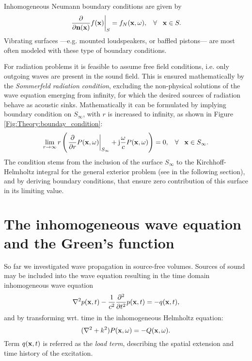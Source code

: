 \begin{itemize}
Inhomogeneous Neumann boundary conditions are given by
\begin{equation}
\left. \frac{\partial}{\partial \mathbf{n}(\mathbf{x})} f(\mathbf{x}) \right|_{S}= f_N(\mathbf{x},\omega), \hspace{3mm} \forall \hspace{3mm} \mathbf{x} \in S.
\end{equation}
Vibrating surfaces ---e.g. mounted loudspeakers, or baffled pistons--- are most often modeled with these type of boundary conditions.
\end{itemize}

For radiation problems it is feasible to assume free field conditions, i.e. only outgoing waves are present in the sound field. This is ensured mathematically by the \emph{Sommerfeld radiation condition}, excluding the non-physical solutions of the wave equation emerging from infinity, for which the desired sources of radiation behave as acoustic sinks.
Mathematically it can be formulated by implying boundary condition on $S_{\infty}$, with $r$ is increased to infinity, as shown in Figure \ref{Fig:Theory:bounday_condition}:
\begin{equation}
\lim_{r \rightarrow \infty} r \left( \left. \frac{\partial}{\partial r}P(\mathbf{x},\omega)\right|_{S_{\infty}} +\mathrm{j} \frac{\omega}{c}P(\mathbf{x},\omega) \right) = 0, \hspace{3mm} \forall \hspace{3mm} \mathbf{x} \in S_{\infty}.
\label{Eq:Theory:Sommerfeld_radiation_condition}
\end{equation}
The condition stems from the inclusion of the surface $S_{\infty}$ to the Kirchhoff-Helmholtz integral for the general exterior problem (see in the following section), and by deriving boundary conditions, that ensure zero contribution of this surface in its limiting value\cite{Schot1992:Eighty_years, Williams1999}.

\newpage
\section{The inhomogeneous wave equation and the Green's function}

So far we investigated wave propagation in source-free volumes. Sources of sound may be included into the wave equation resulting in the time domain inhomogeneous wave equation
\begin{equation}
\nabla^2 p(\mathbf{x},t) -\frac{1}{c^2}\frac{\partial^2}{\partial t^2}p(\mathbf{x},t) = -q(\mathbf{x},t),
\label{Eq:Theory:Inhomogene_wave_eq_time_domain}
\end{equation}
and by transforming wrt. time in the inhomogeneous Helmholtz equation:
\begin{equation}
(\nabla^2 + k^2 ) P(\mathbf{x},\omega ) = -Q(\mathbf{x},\omega).
\end{equation}
Term $q(\mathbf{x},t)$ is referred as the \emph{load term}, describing the spatial extension and time history of the excitation.

